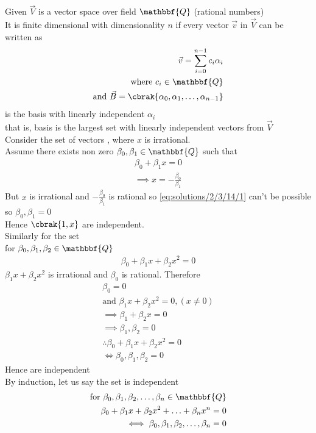 Given $\vec{V}$ is a vector space over field $\mathbbf{Q}$ (rational numbers)\\
It is finite dimensional with dimensionality $n$ if every vector $\vec{v}$ in $\vec{V}$ can be written as
\begin{align}
    \vec{v}=\sum_{i=0}^{n-1} c_i\alpha_i\\
    \text{where }c_i \in \mathbbf{Q}\\
    \text{and } \vec{B}= \cbrak{\alpha_0,\alpha_1,\hdots,\alpha_{n-1} }
\end{align}
is the basis with linearly independent $\alpha_i$\\
that is, basis is the largest set with linearly independent vectors from $\vec{V}$\\
Consider the set of vectors  , where $x$ is irrational.\\
Assume there exists non zero $\beta_0,\beta_1 \in \mathbbf{Q}$ such that
\begin{align}
   \beta_0+\beta_1x=0 \\
   \implies x=-\frac{\beta_0}{\beta_1}\label{eq:solutions/2/3/14/1}
\end{align}
But $x$ is irrational and $-\frac{\beta_0}{\beta_1}$ is rational so \eqref{eq:solutions/2/3/14/1} can't be possible so $\beta_0,\beta_1=0$\\
Hence $\cbrak{1,x}$ are independent.\\
Similarly for the set  \\
for  $\beta_0,\beta_1,\beta_2 \in \mathbbf{Q}$
\begin{align}
  \beta_0+\beta_1x+\beta_2x^2=0  
\end{align}
$\beta_1x+\beta_2x^2$ is irrational and $\beta_0$ is rational. Therefore
\begin{align}
  \beta_0=0\label{eq:solutions/2/3/14/2}\\
  \text{and  } \beta_1x+\beta_2x^2=0,( x \neq 0)\label{eq:solutions/2/3/14/3}\\
  \implies \beta_1+\beta_2x=0  \\
  \implies \beta_1,\beta_2=0\\
  \therefore  \beta_0+\beta_1x+\beta_2x^2=0\\ \iff \beta_0,\beta_1,\beta_2=0
\end{align}
Hence  are independent \\
By induction, let us say the set  is independent
\begin{align}
\text{for  }\beta_0,\beta_1,\beta_2,\hdots,\beta_n \in \mathbbf{Q}\\
    \beta_0+\beta_1x+\beta_2x^2+\hdots+\beta_nx^n=0 \label{eq:solutions/2/3/14/4}\\ \iff    \beta_0,\beta_1,\beta_2,\hdots,\beta_n=0
\end{align}
